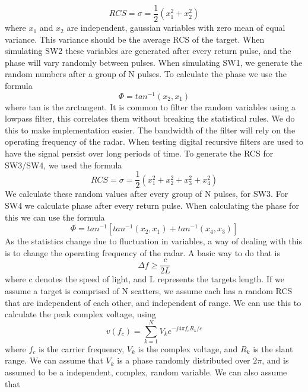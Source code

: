 \documentclass[12pt]{article}
\begin{document}
\begin{equation}
    RCS = \sigma = \frac{1}{2} \left( x_1^2 + x_2^2 \right)
\end{equation}
where $x_1$ and $x_2$ are independent, gaussian variables with zero mean of equal variance. This variance should be the average RCS of the target. When simulating SW2 these variables are generated after every return pulse, and the phase will vary randomly between pulses. When simulating SW1, we generate the random numbers after a group of N pulses. To calculate the phase we use the formula
\begin{equation}
    \Phi = tan^{-1} (x_2, x_1)
\end{equation}
where tan is the arctangent. It is common to filter the random variables using a lowpass filter, this correlates them without breaking the statistical rules. We do this to make implementation easier. The bandwidth of the filter will rely on the operating frequency of the radar. When testing digital recursive filters are used to have the signal persist over long periods of time.
To generate the RCS for SW3/SW4, we used the formula
\begin{equation}
    RCS = \sigma = \frac{1}{2} \left( x_1^2 + x_2^2 +  x_3^2 + x_4^2 \right)
\end{equation}
We calculate these random values after every group of N pulses, for SW3. For SW4 we calculate phase after every return pulse. When calculating the phase for this we can use the formula
\begin{equation}
    \Phi = tan^{-1} \left[ tan^{-1} (x_2, x_1) + tan^{-1} (x_4, x_3)   \right]
\end{equation}
As the statistics change due to fluctuation in variables, a way of dealing with this is to change the operating frequency of the radar. A basic way to do that is 
\begin{equation}
    \Delta f \geq \frac{c}{2L} 
\end{equation}
where c denotes the speed of light, and L represents the targets length. If we assume a target is comprised of N scatters, we assume each has a random RCS that are independent of each other, and independent of range. We can use this to calculate the peak complex voltage, using 
\begin{equation}
    v(f_c) = \sum_{k=1}^{N} V_k e^{-j4\pi f_c R_k / c}
\end{equation}
where $f_c$ is the carrier frequency, $V_k$ is the complex voltage, and $R_k$ is the slant range. We can assume that $V_k$ is a phase randomly distributed over $2\pi$, and is assumed to be a independent, complex, random variable. We can also assume that 
\end{document}
